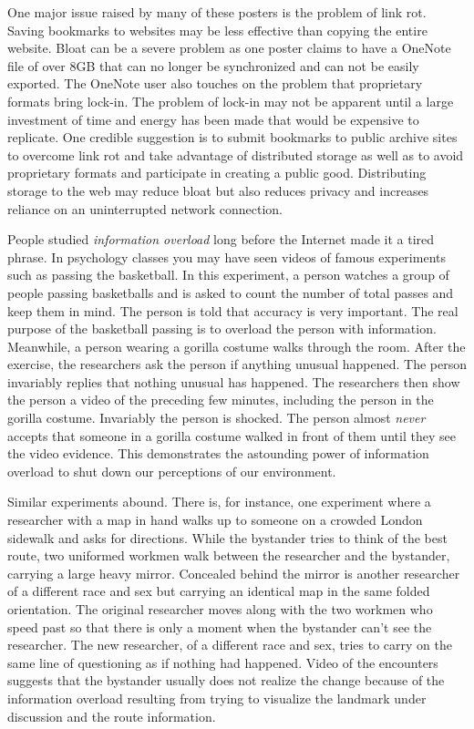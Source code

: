 One major issue raised by many of these posters is the problem of link
rot. Saving bookmarks to websites may be less effective than copying the
entire website. Bloat can be a severe problem as one poster claims to
have a OneNote file of over 8GB that can no longer be synchronized and
can not be easily exported. The OneNote user also touches on the problem
that proprietary formats bring lock-in. The problem of lock-in may not
be apparent until a large investment of time and energy has been made
that would be expensive to replicate. One credible suggestion is to
submit bookmarks to public archive sites to overcome link rot and take
advantage of distributed storage as well as to avoid proprietary formats
and participate in creating a public good. Distributing storage to the
web may reduce bloat but also reduces privacy and increases reliance on
an uninterrupted network connection.

\hypertarget{information}{%
\label{information}}

People studied \emph{information overload} long before the Internet made
it a tired phrase. In psychology classes you may have seen videos of
famous experiments such as passing the basketball. In this experiment, a
person watches a group of people passing basketballs and is asked to
count the number of total passes and keep them in mind. The person is
told that accuracy is very important. The real purpose of the basketball
passing is to overload the person with information. Meanwhile, a person
wearing a gorilla costume walks through the room. After the exercise,
the researchers ask the person if anything unusual happened. The person
invariably replies that nothing unusual has happened. The researchers
then show the person a video of the preceding few minutes, including the
person in the gorilla costume. Invariably the person is shocked. The
person almost \emph{never} accepts that someone in a gorilla costume
walked in front of them until they see the video evidence. This
demonstrates the astounding power of information overload to shut down
our perceptions of our environment.

Similar experiments abound. There is, for instance, one experiment where
a researcher with a map in hand walks up to someone on a crowded London
sidewalk and asks for directions. While the bystander tries to think of
the best route, two uniformed workmen walk between the researcher and
the bystander, carrying a large heavy mirror. Concealed behind the
mirror is another researcher of a different race and sex but carrying an
identical map in the same folded orientation. The original researcher
moves along with the two workmen who speed past so that there is only a
moment when the bystander can't see the researcher. The new researcher,
of a different race and sex, tries to carry on the same line of
questioning as if nothing had happened. Video of the encounters suggests
that the bystander usually does not realize the change because of the
information overload resulting from trying to visualize the landmark
under discussion and the route information.

